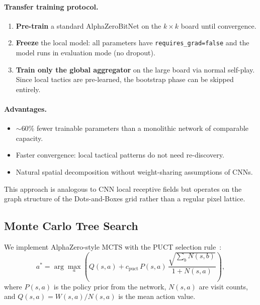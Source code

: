 \documentclass[11pt]{article}
\begin{document}
\paragraph{Transfer training protocol.}
\begin{enumerate}
  \item \textbf{Pre-train} a standard AlphaZeroBitNet on the $k{\times}k$
    board until convergence.
  \item \textbf{Freeze} the local model: all parameters have
    \texttt{requires\_grad=false} and the model runs in evaluation mode
    (no dropout).
  \item \textbf{Train only the global aggregator} on the large board via
    normal self-play. Since local tactics are pre-learned, the bootstrap
    phase can be skipped entirely.
\end{enumerate}

\paragraph{Advantages.}
\begin{itemize}
  \item $\sim$60\% fewer trainable parameters than a monolithic network
    of comparable capacity.
  \item Faster convergence: local tactical patterns do not need
    re-discovery.
  \item Natural spatial decomposition without weight-sharing assumptions
    of CNNs.
\end{itemize}

This approach is analogous to CNN local receptive fields but operates on
the graph structure of the Dots-and-Boxes grid rather than a regular
pixel lattice.

\subsection{Monte Carlo Tree Search}
\label{sec:mcts}

We implement AlphaZero-style MCTS with the PUCT selection
rule~\cite{rosin2011multi}:
\begin{equation}
  a^* = \arg\max_a \left(
    Q(s,a) + c_{\text{puct}} \, P(s,a) \,
    \frac{\sqrt{\textstyle\sum_b N(s,b)}}{1 + N(s,a)}
  \right),
\end{equation}
where $P(s,a)$ is the policy prior from the network, $N(s,a)$ are visit
counts, and $Q(s,a) = W(s,a)/N(s,a)$ is the mean action value.
\end{document}
